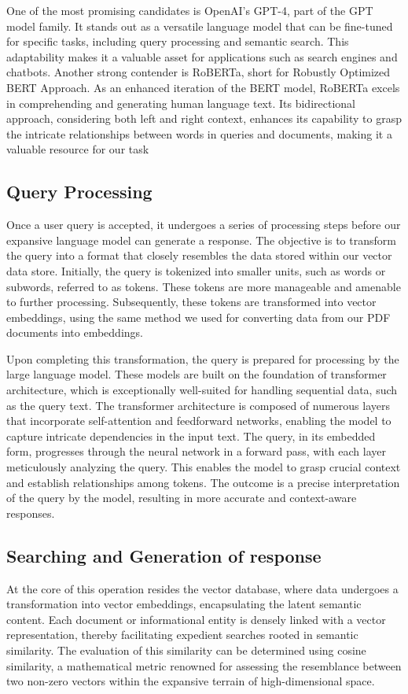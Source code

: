 \documentclass[conference]{IEEEtran}
\begin{document}
One of the most promising candidates is OpenAI's GPT-4, part of the GPT model family. It stands out as a versatile language model that can be fine-tuned for specific tasks, including query processing and semantic search. This adaptability makes it a valuable asset for applications such as search engines and chatbots. Another strong contender is RoBERTa, short for Robustly Optimized BERT Approach. As an enhanced iteration of the BERT model, RoBERTa excels in comprehending and generating human language text. Its bidirectional approach, considering both left and right context, enhances its capability to grasp the intricate relationships between words in queries and documents, making it a valuable resource for our task

\subsection{Query Processing}
Once a user query is accepted, it undergoes a series of processing steps before our expansive language model can generate a response. The objective is to transform the query into a format that closely resembles the data stored within our vector data store. Initially, the query is tokenized into smaller units, such as words or subwords, referred to as tokens. These tokens are more manageable and amenable to further processing. Subsequently, these tokens are transformed into vector embeddings, using the same method we used for  converting data from our PDF documents into embeddings.

Upon completing this transformation, the query is prepared for processing by the large language model. These models are built on the foundation of transformer architecture, which is exceptionally well-suited for handling sequential data, such as the query text. The transformer architecture is composed of numerous layers that incorporate self-attention and feedforward networks, enabling the model to capture intricate dependencies in the input text. The query, in its embedded form, progresses through the neural network in a forward pass, with each layer meticulously analyzing the query. This enables the model to grasp crucial context and establish relationships among tokens. The outcome is a precise interpretation of the query by the model, resulting in more accurate and context-aware responses.

\subsection{Searching and Generation of response}
At the core of this operation resides the vector database, where data undergoes a transformation into vector embeddings, encapsulating the latent semantic content. Each document or informational entity is densely linked with a vector representation, thereby facilitating expedient searches rooted in semantic similarity. The evaluation of this similarity can be determined using cosine similarity, a mathematical metric renowned for assessing the resemblance between two non-zero vectors within the expansive terrain of high-dimensional space.
\end{document}
